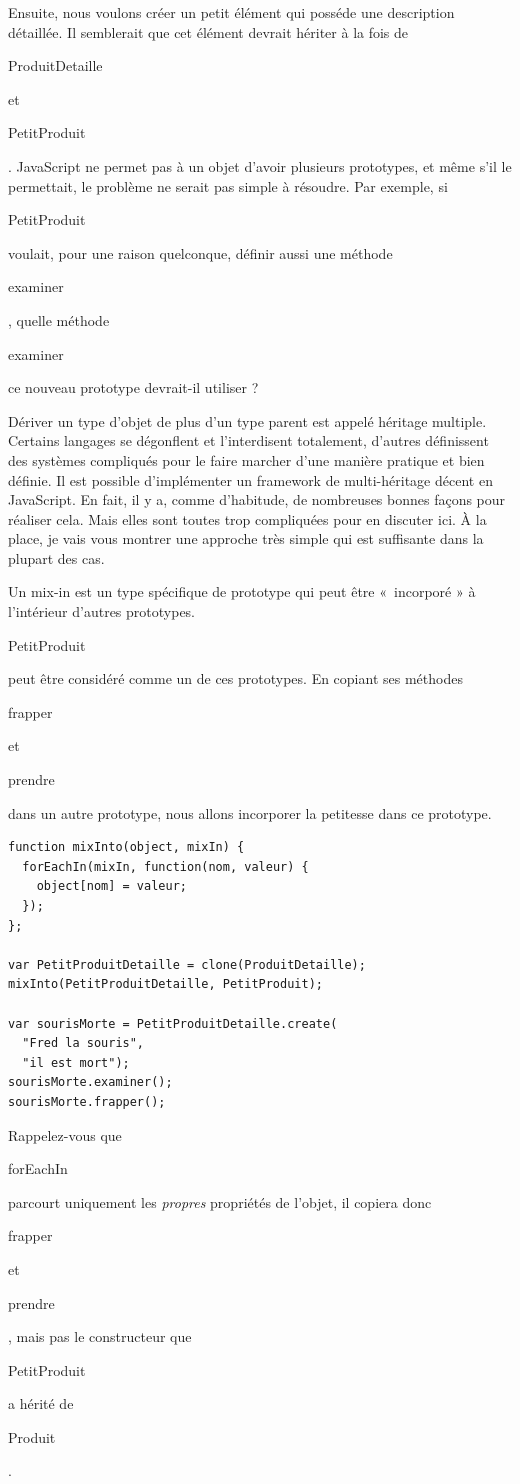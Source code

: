 \documentclass{FramateX}
\renewcommand{\texttt}[1]{\begin{sffamily}{#1}\end{sffamily}}
\begin{document}
Ensuite, nous voulons créer un petit élément qui posséde une description
détaillée. Il semblerait que cet élément devrait hériter à la fois de
\texttt{ProduitDetaille} et \texttt{PetitProduit}. JavaScript ne permet
pas à un objet d'avoir plusieurs prototypes, et même s'il le permettait,
le problème ne serait pas simple à résoudre. Par exemple, si
\texttt{PetitProduit} voulait, pour une raison quelconque, définir aussi
une méthode \texttt{examiner}, quelle méthode \texttt{examiner} ce
nouveau prototype devrait-il utiliser ?

Dériver un type d'objet de plus d'un type parent est appelé héritage
multiple. Certains langages se dégonflent et l'interdisent totalement,
d'autres définissent des systèmes compliqués pour le faire marcher d'une
manière pratique et bien définie. Il est possible d'implémenter un
framework de multi-héritage décent en JavaScript. En fait, il y a, comme
d'habitude, de nombreuses bonnes façons pour réaliser cela. Mais elles
sont toutes trop compliquées pour en discuter ici. À la place, je vais
vous montrer une approche très simple qui est suffisante dans la plupart
des cas.

\begin{center}\end{center}

Un mix-in est un type spécifique de prototype qui peut être «~incorporé
» à l'intérieur d'autres prototypes. \texttt{PetitProduit} peut être
considéré comme un de ces prototypes. En copiant ses méthodes
\texttt{frapper} et \texttt{prendre} dans un autre prototype, nous
allons incorporer la petitesse dans ce prototype.

\begin{lstlisting}
function mixInto(object, mixIn) {
  forEachIn(mixIn, function(nom, valeur) {
    object[nom] = valeur;
  });
};

var PetitProduitDetaille = clone(ProduitDetaille);
mixInto(PetitProduitDetaille, PetitProduit);

var sourisMorte = PetitProduitDetaille.create(
  "Fred la souris",
  "il est mort");
sourisMorte.examiner();
sourisMorte.frapper();
\end{lstlisting}
Rappelez-vous que \texttt{forEachIn} parcourt uniquement les
\emph{propres} propriétés de l'objet, il copiera donc \texttt{frapper}
et \texttt{prendre}, mais pas le constructeur que \texttt{PetitProduit}
a hérité de \texttt{Produit}.

\begin{center}\end{center}
\end{document}
